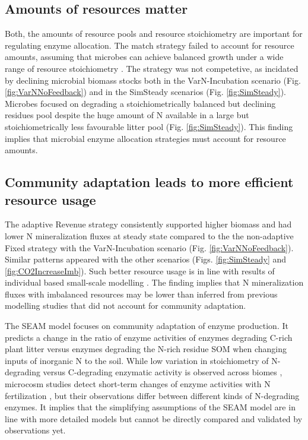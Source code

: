 \subsection{Amounts of resources matter}
Both, the amounts of resource pools and resource stoichiometry are important for
regulating enzyme allocation. The match strategy failed to account for resource
amounts, assuming that microbes can achieve balanced growth under a wide
range of resource stoichiometry \citep{Moorhead12, Ballantyne14}. The strategy
was not competetive, as incidated by declining microbial biomass stocks both in
the VarN-Incubation scenario (Fig. \ref{fig:VarNNoFeedback}) and in the
SimSteady scenarios (Fig. \ref{fig:SimSteady}). Microbes focused on degrading a
stoichiometrically balanced but declining residues pool despite the huge amount
of N available in a large but stoichiometrically less favourable litter pool
(Fig. \ref{fig:SimSteady}). This finding implies that microbial enzyme
allocation strategies must account for resource amounts.

\subsection{Community adaptation leads to more efficient resource usage}
The adaptive Revenue strategy consistently supported higher biomass and had
lower N mineralization fluxes at steady state compared to the the non-adaptive
Fixed strategy with the VarN-Incubation scenario (Fig.
\ref{fig:VarNNoFeedback}). Similar patterns appeared with the other scenarios
(Figs. \ref{fig:SimSteady} and \ref{fig:CO2IncreaseImb}). Such better resource
usage is in line with results of individual based small-scale modelling
\citep{Kaiser14}.
The finding implies that N mineralization fluxes with imbalanced resources may
be lower than inferred from previous modelling studies that did not account for
community adaptation.

The SEAM model focuses on community adaptation of enzyme production. It predicts
a change in the ratio of enzyme activities of enzymes degrading C-rich plant
litter versus enzymes degrading the N-rich residue SOM when changing inputs of
inorganic N to the soil.
While low variation in stoichiometry of N-degrading versus C-degrading enzymatic
activity is observed across biomes \citep{Sinsabaugh09}, microcosm studies
detect short-term changes of enzyme activities with N fertilization
\citep{Kumar16}, but their observations differ between different kinds of N-degrading
enzymes. It implies that the simplifying assumptions of the SEAM model are
in line with more detailed models but cannot be directly compared and
validated by observations yet.

